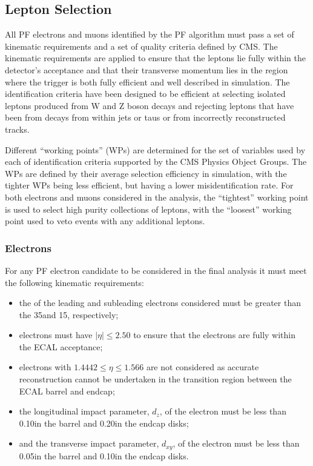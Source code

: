 \subsection{Lepton Selection}
All PF electrons and muons identified by the PF algorithm must pass a set of kinematic requirements and a set of quality criteria defined by CMS.
The kinematic requirements are applied to ensure that the leptons lie fully within the detector's acceptance and that their transverse momentum lies in the region where the trigger is both fully efficient and well described in simulation.
The identification criteria have been designed to be efficient at selecting isolated leptons produced from W and Z boson decays and rejecting leptons that have been from decays from within jets or taus or from incorrectly reconstructed tracks.

Different ``working points'' (WPs) are determined for the set of variables used by each of identification criteria supported by the CMS Physics Object Groups.
The WPs are defined by their average selection efficiency in simulation, with the tighter WPs being less efficient, but having a lower misidentification rate.
For both electrons and muons  considered in the analysis, the ``tightest'' working point is used to select high purity collections of leptons, with the ``loosest'' working point used to veto events with any additional leptons.

\subsubsection{Electrons}\label{subsubsec:electronSelection}
For any PF electron candidate to be considered in the final analysis it must meet the following kinematic requirements:

\begin{itemize}
\item the \pt of the leading and subleading electrons considered must be greater than the 35\GeVc and 15\GeVc, respectively;
\item electrons must have $|\eta| \leq 2.50$ to ensure that the electrons are fully within the ECAL acceptance;
\item electrons with $1.4442 \leq \eta \leq 1.566$ are not considered as  accurate reconstruction cannot be undertaken in the transition region between the ECAL barrel and endcap;
\item the longitudinal impact parameter, $d_{z}$, of the electron must be less than 0.10\cm in the barrel and 0.20\cm in the endcap disks;
\item and the transverse impact parameter, $d_{xy}$, of the electron must be less than 0.05\cm in the barrel and 0.10\cm in the endcap disks.
\end{itemize}

